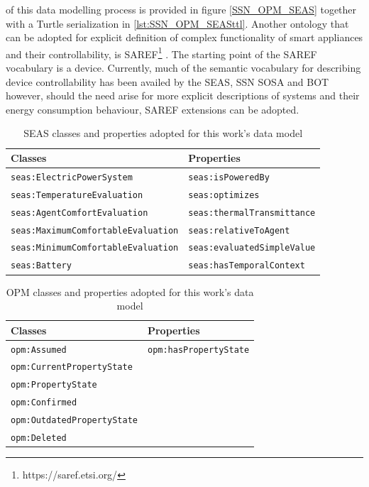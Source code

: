 \begin{enumerate}
of this data modelling process is provided in figure \ref{SSN_OPM_SEAS} together with a Turtle serialization in \autoref{lst:SSN_OPM_SEASttl}. Another ontology that can be adopted for explicit definition of complex functionality of smart appliances and their controllability, is \ac{SAREF}\footnote{https://saref.etsi.org/} \citep{Daniele2015}. The starting point of the \ac{SAREF} vocabulary is a device. Currently, much of the semantic vocabulary for describing device controllability has been availed by the \ac{SEAS}, \ac{SSN} \ac{SOSA} and \ac{BOT} however, should the need arise for more explicit descriptions of systems and their energy consumption behaviour, \ac{SAREF} extensions can be adopted.  
\begin{table}[!h]
	\centering
        \caption{SEAS classes and properties adopted for this work's data model}
	\begin{tabular}{l|l}
		\hline \hline
		Classes & Properties  \bigstrut \\ \hline
		\texttt{seas:ElectricPowerSystem} & \texttt{seas:isPoweredBy}  \bigstrut \\
		\texttt{seas:TemperatureEvaluation} & \texttt{seas:optimizes}  \bigstrut \\
		\texttt{seas:AgentComfortEvaluation} & \texttt{seas:thermalTransmittance}  \bigstrut \\
		\texttt{seas:MaximumComfortableEvaluation} & \texttt{seas:relativeToAgent} \bigstrut \\
		\texttt{seas:MinimumComfortableEvaluation} & \texttt{seas:evaluatedSimpleValue} \bigstrut \\
		\texttt{seas:Battery} & \texttt{seas:hasTemporalContext} \bigstrut \\
	\end{tabular}
	\label{SEAS}
\end{table}

\begin{table}[!h]
	\centering
        \caption{OPM classes and properties adopted for this work's data model}
	\begin{tabular}{l|l}
		\hline \hline
		Classes & Properties  \bigstrut \\ \hline
		\texttt{opm:Assumed} & \texttt{opm:hasPropertyState}  \bigstrut \\
		\texttt{opm:CurrentPropertyState} & \bigstrut \\
		\texttt{opm:PropertyState} & \bigstrut \\
		\texttt{opm:Confirmed} & \bigstrut \\
		\texttt{opm:OutdatedPropertyState} & \bigstrut \\
		\texttt{opm:Deleted} & \bigstrut \\
		
	\end{tabular}
	\label{OPM}
\end{table}
\end{enumerate}

